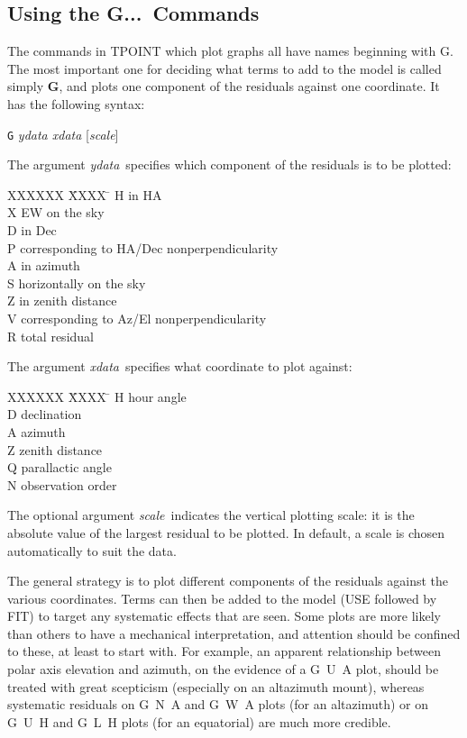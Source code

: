 \subsection{Using the G...\ Commands}
The commands in TPOINT which plot graphs all have names
beginning with G.  The most important one for
deciding what terms to add to the model is called simply {\bf G},
and plots one
component of the residuals against one coordinate.  It has the
following syntax:
\begin{cmnds}
\> \> {\tt G} {\it ydata xdata} [{\it scale}]
\end{cmnds}
The argument {\it ydata}\, specifies which component of the
residuals is to be plotted:
\begin{tabs}
XXXXXX \= XXXX \= \kill
\> H \> in HA \\
\> X \> EW on the sky \\
\> D \> in Dec \\
\> P \> corresponding to HA/Dec nonperpendicularity \\
\> A \> in azimuth \\
\> S \> horizontally on the sky \\
\> Z \> in zenith distance \\
\> V \> corresponding to Az/El nonperpendicularity \\
\> R \> total residual
\end{tabs}
The argument {\it xdata}\, specifies what coordinate to plot against:
\begin{tabs}
XXXXXX \= XXXX \= \kill
\> H \> hour angle \\
\> D \> declination \\
\> A \> azimuth \\
\> Z \> zenith distance \\
\> Q \> parallactic angle \\
\> N \> observation order
\end{tabs}
The optional argument {\it scale}\, indicates the vertical plotting
scale: it is the absolute value of the largest residual to be
plotted.  In default, a scale is chosen automatically to suit
the data.

The general strategy is to plot different components of the residuals
against the various coordinates.  Terms can then be
added to the model (USE followed by FIT) to target
any systematic effects that are seen.  Some plots are more likely
than others to have a mechanical interpretation, and attention
should be confined to these, at least to start with.  For example,
an apparent relationship between polar axis elevation and azimuth,
on the evidence of a G~U~A plot, should be treated with great
scepticism (especially on an altazimuth mount), whereas systematic
residuals on G~N~A and G~W~A plots (for an altazimuth) or on
G~U~H and G~L~H plots (for an equatorial) are much more credible.

